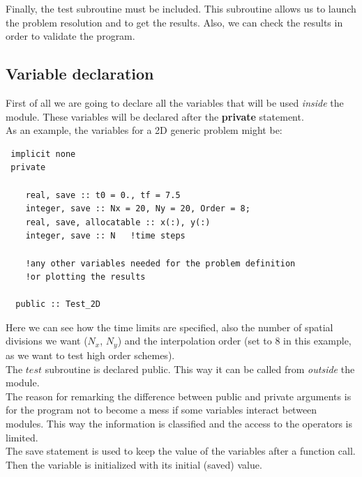 Finally, the test subroutine must be included. This subroutine allows us to
launch the problem resolution and to get the results. Also, we can check the
results in order to validate the program.\\

\subsection{Variable declaration}

First of all we are going to declare all the variables that will be used
\textit{inside} the module. These variables will be declared after the
\textbf{private} statement. \\

As an example, the variables for a 2D generic problem might be: 

\begin{blueframed}
\begin{lstlisting}
 implicit none 
 private 

 	real, save :: t0 = 0., tf = 7.5 
 	integer, save :: Nx = 20, Ny = 20, Order = 8; 
 	real, save, allocatable :: x(:), y(:) 
 	integer, save :: N   !time steps
 	
 	!any other variables needed for the problem definition 
 	!or plotting the results
 
  public :: Test_2D
\end{lstlisting}
\end{blueframed}

Here we can see how the time limits are specified, also the number of spatial
divisions we want ($N_x$, $N_y$) and the interpolation order (set to $8$ in
this example, as we want to test high order schemes).\\

The $test$ subroutine is declared public. This way it can be called from
\textit{outside} the module. \\

The reason for remarking the difference between public and private arguments is
for the program not to become a mess if some variables interact between modules.
This way the information is classified and the access to the operators is
limited. \\

The save statement is used to keep the value of the variables after a function
call. Then the variable is initialized with its initial (saved) value. \\

